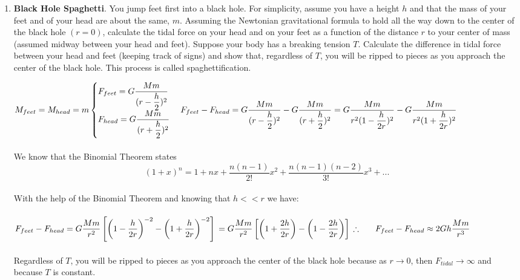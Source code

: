 \documentclass[fleqn]{article}
\begin{document}
\begin{enumerate}
    \item \textbf{Black Hole Spaghetti}. You jump feet first into a black hole. For simplicity, assume you have
    a height $h$ and that the mass of your feet and of your head are about the same, $m$. Assuming the Newtonian gravitational formula to hold
    all the way down to the center of the black hole $(r = 0)$, calculate the tidal force on your head and on your feet as a function of the distance $r$
    to your center of mass (assumed midway between your head and feet). Suppose your body has a breaking tension $T$. Calculate the difference
    in tidal force between your head and feet (keeping track of signs) and show that, regardless of $T$, you will be ripped to pieces as you approach
    the center of the black hole. This process is called spaghettification.

      \textcolor{hwColor}{
        $
          M_{feet}=M_{head}=m \\
          \\
          \begin{cases}
            F_{feet}=G \dfrac{M m}{(r-\dfrac{h}{2})^2}
            \\
            F_{head}=G \dfrac{M m}{(r+\dfrac{h}{2})^2}
          \end{cases}
          \\
          \\
          F_{feet}-F_{head}=G \dfrac{M m}{(r-\dfrac{h}{2})^2}-G \dfrac{M m}{(r+\dfrac{h}{2})^2}
          \\
          \\
          \\
          =G \dfrac{M m}{r^2(1-\dfrac{h}{2r})^2}-G \dfrac{M m}{r^2(1+\dfrac{h}{2r})^2}
        $
        \\
        \\
        We know that the Binomial Theorem states 
        $$(1+x)^n=1+nx+\dfrac{n(n-1)}{2!}x^2+\dfrac{n(n-1)(n-2)}{3!}x^3+...$$
        \\
        With the help of the Binomial Theorem and knowing that $h<<r$ we have:
        \\
        \\
        $
          F_{feet}-F_{head}=G \dfrac{Mm}{r^2} \left[\left(1-\dfrac{h}{2r}\right)^{-2}-\left(1+\dfrac{h}{2r}\right)^{-2}\right]
          \\
          \\
          =G \dfrac{Mm}{r^2} \left[\left(1+\dfrac{2h}{2r}\right)-\left(1-\dfrac{2h}{2r}\right)\right]
          \\
          \\
          \\
          \therefore ~~~~~ F_{feet}-F_{head} \approx 2Gh \dfrac{Mm}{r^3}
        $
        \\
        \\
        Regardless of $T$, you will be ripped to pieces as you approach the center of the black hole because
        as $r \to 0$, then $F_{tidal} \to \infty$ and because $T$ is constant.
      }


\end{enumerate}
\end{document}
